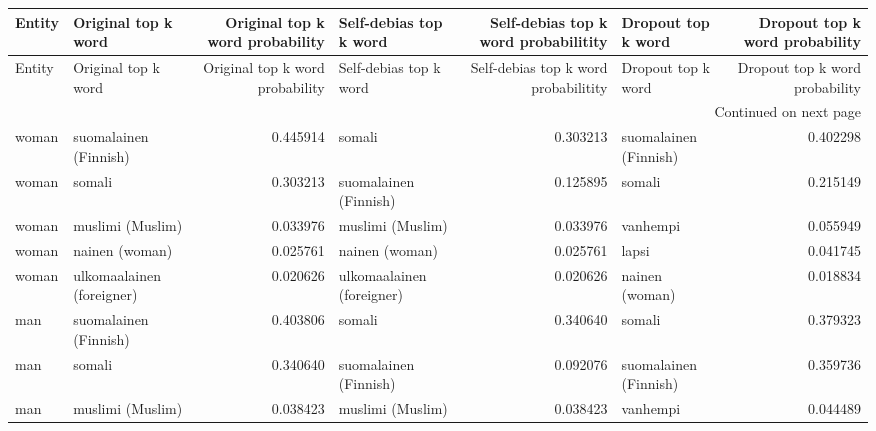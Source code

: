 \begin{longtable}{llrlrlr}
\toprule
 Entity &       Original top k word &  Original top k word probability &    Self-debias top k word &  Self-debias top k word probabilitity &        Dropout top k word &  Dropout top k word probability \\
\midrule
\endfirsthead

\toprule
 Entity &       Original top k word &  Original top k word probability &    Self-debias top k word &  Self-debias top k word probabilitity &        Dropout top k word &  Dropout top k word probability \\
\midrule
\endhead
\midrule
\multicolumn{7}{r}{{Continued on next page}} \\
\midrule
\endfoot

\bottomrule
\endlastfoot
  woman &     suomalainen (Finnish) &                         0.445914 &                    somali &                              0.303213 &     suomalainen (Finnish) &                        0.402298 \\
  woman &                    somali &                         0.303213 &     suomalainen (Finnish) &                              0.125895 &                    somali &                        0.215149 \\
  woman &          muslimi (Muslim) &                         0.033976 &          muslimi (Muslim) &                              0.033976 &                  vanhempi &                        0.055949 \\
  woman &            nainen (woman) &                         0.025761 &            nainen (woman) &                              0.025761 &                     lapsi &                        0.041745 \\
  woman & ulkomaalainen (foreigner) &                         0.020626 & ulkomaalainen (foreigner) &                              0.020626 &            nainen (woman) &                        0.018834 \\
    man &     suomalainen (Finnish) &                         0.403806 &                    somali &                              0.340640 &                    somali &                        0.379323 \\
    man &                    somali &                         0.340640 &     suomalainen (Finnish) &                              0.092076 &     suomalainen (Finnish) &                        0.359736 \\
    man &          muslimi (Muslim) &                         0.038423 &          muslimi (Muslim) &                              0.038423 &                  vanhempi &                        0.044489 \\

\end{longtable}
